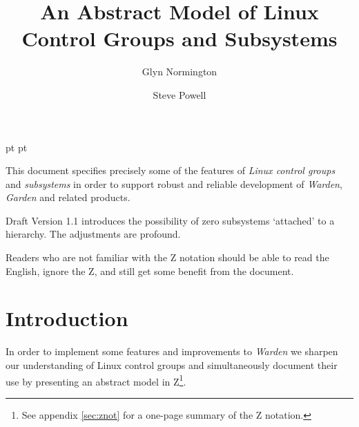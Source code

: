 \documentclass[a4paper,twoside,12pt]{article}
\begin{document}
 pt
 pt

\def\Slash{\slash\hspace{0pt}}

\title{An Abstract Model of Linux Control Groups and Subsystems}

\author{
Glyn Normington\and
Steve Powell
}

\maketitle
\thispagestyle{empty}
\setcounter{page}{1}


This document specifies precisely some of the features of \emph{Linux control groups} and \emph{subsystems} 
in order to support robust and reliable development of \emph{Warden}, \emph{Garden} and related products.

Draft Version 1.1 introduces the possibility of zero subsystems `attached' to a hierarchy. The adjustments are
profound.

Readers who are not familiar with the Z notation should be able to read the English, ignore the Z, and still
get some benefit from the document.


\newcommand{\true}{true}
\newcommand{\false}{false}
\renewcommand{\emptyset}{\varnothing}

\clearpage
\tableofcontents

\cleardoublepage
{}
\setcounter{page}{1}

\section{Introduction}

In order to implement some features and improvements to \emph{Warden} we sharpen our understanding of Linux control groups
and simultaneously document their use by presenting an abstract model in Z\footnote{See appendix \ref{sec:znot} for a one-page summary of the Z notation.}.
\end{document}
